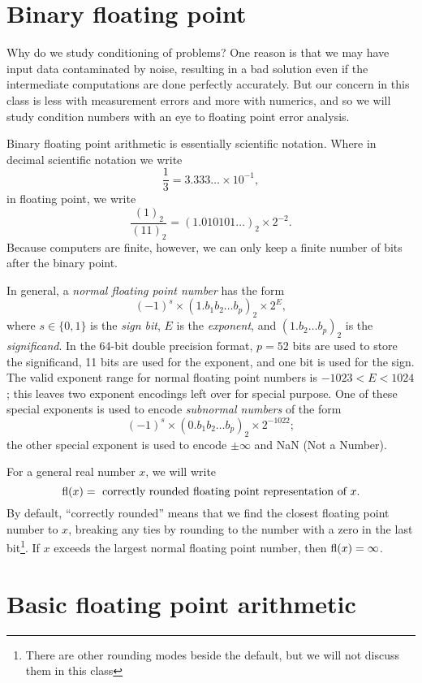\documentclass[12pt, leqno]{article}
\begin{document}

\section*{Binary floating point}

Why do we study conditioning of problems?  One reason is that we may have
input data contaminated by noise, resulting in a bad solution even if the
intermediate computations are done perfectly accurately.  But our concern in
this class is less with measurement errors and more with numerics, and so
we will study condition numbers with an eye to floating point error analysis.

Binary floating point arithmetic is essentially scientific notation.
Where in decimal scientific notation we write
\[
  \frac{1}{3} 
  = 3.333\ldots \times 10^{-1},
\]
in floating point, we write
\[
  \frac{(1)_2}{(11)_2} 
  = (1.010101\ldots)_2 \times 2^{-2}.
\]
Because computers are finite, however, we can only keep a finite
number of bits after the binary point.

In general, a {\em normal floating point number} has the form
\[
  (-1)^s \times (1.b_1 b_2 \ldots b_p)_2 \times 2^{E},
\]
where $s \in \{0,1\}$ is the {\em sign bit}, 
$E$ is the {\em exponent}, and 
$(1.b_2 \ldots b_p)_2$ is the {\em significand}.
In the 64-bit double precision format, $p = 52$ bits are used to store
the significand, 11 bits are used for the exponent, and one bit is
used for the sign.  The valid exponent range for normal floating point
numbers is $-1023 < E < 1024$; this leaves two exponent encodings left
over for special purpose.  One of these special exponents is used to
encode {\em subnormal numbers} of the form
\[
  (-1)^s \times (0.b_1 b_2 \ldots b_p)_2 \times 2^{-1022};
\]
the other special exponent is used to encode $\pm \infty$ and NaN
(Not a Number).

For a general real number $x$, we will write
\[
  \operatorname{fl}(x) = \mbox{ correctly rounded floating point representation of } x.
\]
By default, ``correctly rounded'' means that we find the closest
floating point number to $x$, breaking any ties by rounding to the
number with a zero in the last bit\footnote{%
There are other rounding modes beside the default, but we will not
discuss them in this class}.
If $x$ exceeds the largest normal floating point number, 
then $\operatorname{fl}(x) = \infty$.

\section*{Basic floating point arithmetic}
\end{document}
